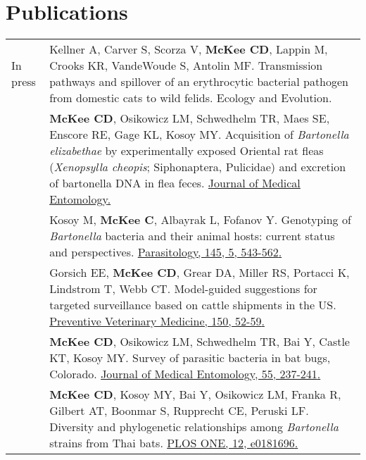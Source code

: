 \documentclass[letterpaper]{deedy-resume} %
\begin{document}

\section{Publications}
\begin{tabular}{>{\raggedright\arraybackslash}p{2cm}p{16cm}}


In press & Kellner A, Carver S, Scorza V, \textbf{McKee CD}, Lappin M, Crooks KR, VandeWoude S, Antolin MF. Transmission pathways and spillover of an erythrocytic bacterial pathogen from domestic cats to wild felids. \textcolor{special}{Ecology and Evolution}.\\

2018 & \textbf{McKee CD}, Osikowicz LM, Schwedhelm TR, Maes SE, Enscore RE, Gage KL, Kosoy MY. Acquisition of \textit{Bartonella elizabethae} by experimentally exposed Oriental rat fleas (\textit{Xenopsylla cheopis}; Siphonaptera, Pulicidae) and excretion of bartonella DNA in flea feces. \href{https://doi.org/10.1093/jme/tjy085}{\textcolor{special}{Journal of Medical Entomology}.}\\

2018 & Kosoy M, \textbf{McKee C}, Albayrak L, Fofanov Y. Genotyping of \textit{Bartonella} bacteria and their animal hosts: current status and perspectives. \href{https://doi.org/10.1017/S0031182017001263}{\textcolor{special}{Parasitology, 145, 5, 543-562}.}\\

2018 & Gorsich EE, \textbf{McKee CD}, Grear DA, Miller RS, Portacci K, Lindstrom T, Webb CT. Model-guided suggestions for targeted surveillance based on cattle shipments in the US. \href{https://doi.org/10.1016/j.prevetmed.2017.12.004}{\textcolor{special}{Preventive Veterinary Medicine, 150, 52-59}.}\\

2018 & \textbf{McKee CD}, Osikowicz LM, Schwedhelm TR, Bai Y, Castle KT, Kosoy MY. Survey of parasitic bacteria in bat bugs, Colorado. \href{https://doi.org/10.1093/jme/tjx155}{\textcolor{special}{Journal of Medical Entomology, 55, 237-241}.}\\

2017 & \textbf{McKee CD}, Kosoy MY, Bai Y, Osikowicz LM, Franka R, Gilbert AT, Boonmar S, Rupprecht CE, Peruski LF. Diversity and phylogenetic relationships among \textit{Bartonella} strains from Thai bats. \href{https://doi.org/10.1371/journal.pone.0181696}{\textcolor{special}{PLOS ONE, 12, e0181696}.}\\

\end{tabular}
\end{document}
